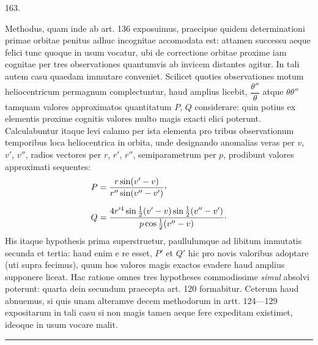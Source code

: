 \par{}\medskip
\begin{center}\hypertarget{native-226-article163}{}163.\end{center}
Methodus, quam inde ab art. 136 exposuimus, praecipue quidem determinationi
primae orbitae penitus adhuc incognitae accomodata est: attamen successu aeque
felici tunc quoque in usum vocatur, ubi de correctione orbitae proxime iam
cognitae per tres observationes quantumvis ab invicem distantes agitur.
In tali autem casu quaedam immutare conveniet. Scilicet quoties observationes
motum heliocentricum permagnum complectuntur, haud amplius licebit,
$\dfrac{\theta''}{\theta}$ atque $\theta\theta''$ tamquam valores approximatos
quantitatum $P$, $Q$ considerare: quin potius ex elementis proxime cognitis
valores multo magis exacti elici poterunt. Calculabuntur itaque levi calamo
per ista elementa pro tribus observationum temporibus loca heliocentrica in
orbita, unde designando anomalias veras per $v$, $v'$, $v''$, radios vectores
per $r$, $r'$, $r''$, semiparametrum per $p$, prodibunt valores approximati sequentes:
\[
\begin{aligned}
P&=\frac{r\sin(v'-v)}{r''\sin(v''-v')}\mathpunct{\raisebox{.45ex}{,}}\\[.6em]
Q&=\frac{4r'^4\sin\frac12(v'-v)\sin\frac12(v''-v')}{p\cos\frac12(v''-v)}\mathpunct{\cdot}
\end{aligned}
\]
\noindent His itaque hypothesis prima superstruetur, paullulumque ad libitum immutatis
secunda et tertia: haud enim e re esset, $P'$ et $Q'$ hic pro novis valoribus
adoptare (uti supra fecimus), quum hos valores magis exactos evadere haud
amplius supponere liceat. Hac ratione omnes tres hypotheses commodissime
\emph{simul} absolvi poterunt: quarta dein secundum praecepta art. 120 formabitur.
Ceterum haud abnuemus, si quis unam alteramve decem methodorum in artt.
124---129 expositarum in tali casu si non magis tamen aeque fere expeditam
existimet, ideoque in usum vocare malit.
\par\bigskip\begin{center}\rule{.23\linewidth}{.35pt}\end{center}
